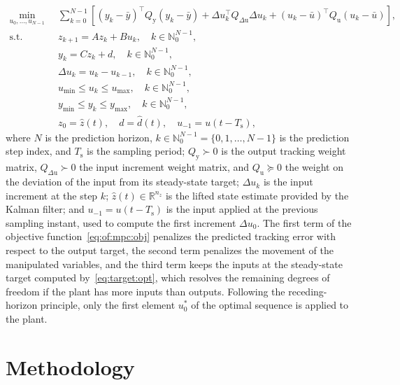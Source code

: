 \documentclass[preprint,12pt,authoryear]{elsarticle}
\theoremstyle{remark}
\begin{document}
\begin{subequations}
  \label{eq:of:mpc}
  \begin{align}
    \min_{u_0, \ldots, u_{N-1}} \; & \; \sum_{k=0}^{N-1} \left[ (y_k - \bar{y})^\intercal Q_\text{y} (y_k - \bar{y}) + \Delta u_k^\intercal Q_{\Delta\text{u}} \Delta u_k + (u_k - \bar{u})^\intercal Q_\text{u} (u_k - \bar{u}) \right], \label{eq:of:mpc:obj} \\
    \text{s.t.} \;\;\;\; & \; z_{k+1} = A z_k + B u_k, \quad k\in\mathbb{N}_0^{N-1}, \label{eq:of:mpc:z} \\
    & \; y_k = C z_k + d, \quad k\in\mathbb{N}_0^{N-1}, \label{eq:of:mpc:y} \\
    & \; \Delta u_k = u_k - u_{k-1}, \quad k\in\mathbb{N}_0^{N-1}, \label{eq:of:mpc:du} \\
    & \; u_{\min} \leq u_k \leq u_{\max}, \quad k\in\mathbb{N}_0^{N-1}, \label{eq:of:mpc:u} \\
    & \; y_{\min} \leq y_k \leq y_{\max}, \quad k\in\mathbb{N}_0^{N-1}, \label{eq:of:mpc:ycon} \\
    & \; z_0 = \hat{z}(t), \quad d = \hat{d}(t), \quad u_{-1} = u(t-T_\text{s}), \label{eq:of:mpc:init}
  \end{align}
\end{subequations}
where $N$ is the prediction horizon, $k \in \mathbb{N}_0^{N-1} = \{0, 1, \ldots, N-1\}$ is the prediction step index, and $T_\text{s}$ is the sampling period; $Q_\text{y} \succ 0$ is the output tracking weight matrix, $Q_{\Delta\text{u}} \succ 0$ the input increment weight matrix, and $Q_\text{u} \succeq 0$ the weight on the deviation of the input from its steady-state target; $\Delta u_k$ is the input increment at the step $k$; $\hat{z}(t) \in \mathbb{R}^{n_z}$ is the lifted state estimate provided by the Kalman filter; and $u_{-1} = u(t - T_\text{s})$ is the input applied at the previous sampling instant, used to compute the first increment $\Delta u_0$. The first term of the objective function~\eqref{eq:of:mpc:obj} penalizes the predicted tracking error with respect to the output target, the second term penalizes the movement of the manipulated variables, and the third term keeps the inputs at the steady-state target computed by~\eqref{eq:target:opt}, which resolves the remaining degrees of freedom if the plant has more inputs than outputs. Following the receding-horizon principle, only the first element $u_0^*$ of the optimal sequence is applied to the plant.



\section{Methodology}
\label{sec:method}
\end{document}
